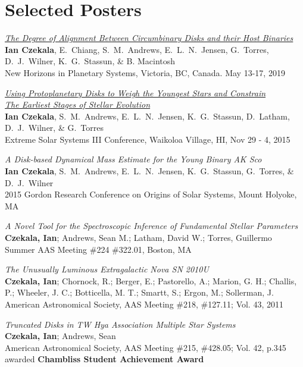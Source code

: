 \section*{Selected Posters}
\begin{etaremune}
\item \href{https://figshare.com/articles/The_Degree_of_Alignment_Between_Circumbinary_Disks_and_Their_Host_Binaries/9209357}{\emph{The Degree of Alignment Between Circumbinary Disks and their Host Binaries}}\\
\textbf{Ian Czekala}, E.~Chiang, S.~M.~Andrews, E.~L.~N.~Jensen, G.~Torres, D.~J.~Wilner, K.~G.~Stassun, \& B. Macintosh \\
New Horizons in Planetary Systems, Victoria, BC, Canada. May 13-17, 2019
\item \href{https://figshare.com/articles/Using_Protoplanetary_Disks_to_Weigh_the_Youngest_Stars_and_Constrain_The_Earliest_Stages_of_Stellar_Evolution/1613531}{\emph{Using Protoplanetary Disks to Weigh the Youngest Stars and Constrain}}\\
\href{https://figshare.com/articles/Using_Protoplanetary_Disks_to_Weigh_the_Youngest_Stars_and_Constrain_The_Earliest_Stages_of_Stellar_Evolution/1613531}{\emph{The Earliest Stages of Stellar Evolution}} \\
\textbf{Ian Czekala}, S.~M.~Andrews, E.~L.~N.~Jensen, K.~G.~Stassun, D.~Latham, D.~J.~Wilner, \& G.~Torres\\
Extreme Solar Systems III Conference, Waikoloa Village, HI, Nov 29 - 4, 2015
\item \emph{A Disk-based Dynamical Mass Estimate for the Young Binary AK Sco}\\
\textbf{Ian Czekala}, S.~M.~Andrews, E.~L.~N.~Jensen, K.~G.~Stassun, G.~Torres, \& D.~J.~Wilner\\
2015 Gordon Research Conference on Origins of Solar Systems, Mount Holyoke, MA
\item \emph{A Novel Tool for the Spectroscopic Inference of Fundamental Stellar Parameters}\\
\textbf{Czekala, Ian};  Andrews, Sean M.; Latham, David W.; Torres, Guillermo\\
Summer AAS Meeting \#224 \#322.01, Boston, MA
\item \emph{The Unusually Luminous Extragalactic Nova SN 2010U}\\
\textbf{Czekala, Ian}; Chornock, R.; Berger, E.; Pastorello, A.; Marion, G. H.; Challis, P.; Wheeler, J. C.; Botticella, M. T.; Smartt, S.; Ergon, M.; Sollerman, J.\\
American Astronomical Society, AAS Meeting \#218, \#127.11; Vol. 43, 2011
\item \emph{Truncated Disks in TW Hya Association Multiple Star Systems}\\
\textbf{Czekala, Ian}; Andrews, Sean\\
American Astronomical Society, AAS Meeting \#215, \#428.05; Vol. 42, p.345 awarded \textbf{Chambliss Student Achievement Award}
\end{etaremune}



